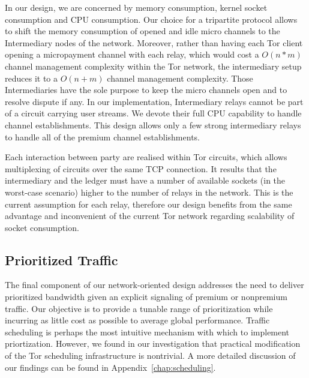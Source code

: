 In our design, we are concerned by memory consumption, kernel socket consumption and CPU consumption. Our choice for a tripartite protocol allows to shift the memory consumption of opened and idle micro channels to the Intermediary nodes of the network. Moreover, rather than having each Tor client opening a micropayment channel with each relay, which would cost a $O(n*m)$ channel management complexity within the Tor network, the intermediary setup reduces it to a $O(n+m)$ channel management complexity.
 Those Intermediaries have the sole purpose to keep the micro channels open and to resolve dispute if any. In our implementation, Intermediary relays cannot be part of a circuit carrying user streams. We devote their full CPU capability to handle channel establishments. This design allows only a few strong intermediary relays to handle all of the premium channel establishments.

Each interaction between party are realised within Tor circuits, which allows
multiplexing of circuits over the same TCP connection. It results that the
intermediary and the ledger must have a number of available sockets (in the
worst-case scenario) higher to the number of relays in the network. This is the
current assumption for each relay, therefore our design benefits from the same
advantage and inconvenient of the current Tor network regarding scalability of
socket consumption.

\subsection{Prioritized Traffic}
\label{subsub:prioritized}

The final component of our network-oriented design addresses the need to deliver
prioritized bandwidth given an explicit signaling of premium or nonpremium
traffic. Our objective is to provide a tunable range of prioritization while
incurring as little cost as possible to average global performance. Traffic
scheduling is perhaps the most intuitive mechanism with which to implement
priortization. However, we found in our investigation that practical
modification of the Tor scheduling infrastructure is nontrivial. A more detailed
discussion of our findings can be found in Appendix~\ref{chap:scheduling}.


